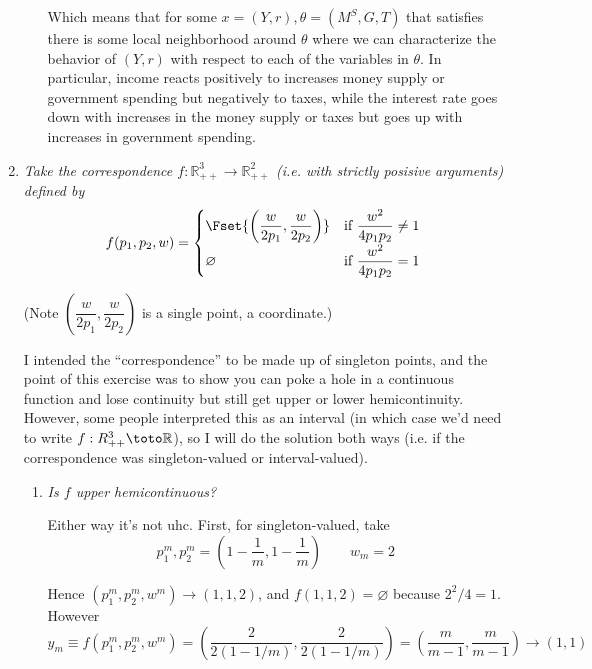\documentclass{article}
\begin{document}
\begin{enumerate}[1.]
\begin{enumerate}[a)]
      Which means that for some $x = (Y, r), \theta = (M^S, G, T)$ that satisfies  there is some local neighborhood around $\theta$ where we can characterize the behavior of $(Y, r)$ with respect to each of the variables in $\theta$. In particular, income reacts positively to increases money supply or government spending but negatively to taxes, while the interest rate goes down with increases in the money supply or taxes but goes up with increases in government spending.
    \end{enumerate}

  \item {\itshape
    Take the correspondence $f: \mathbb{R}^3_{++} \to \mathbb{R}^2_{++}$ (i.e. with strictly posisive arguments) defined by
    \[
      f(p_1, p_2, w)
      =
      \begin{cases}
        \Fset{
          \left(\dfrac{w}{2p_1}, \dfrac{w}{2 p_2}\right)
        }
          & \text{if } \dfrac{w^2}{4 p_1 p_2} \ne 1 \\[6pt]
        \varnothing
          & \text{if } \dfrac{w^2}{4 p_1 p_2} = 1
      \end{cases}
    \]

    (Note $\left(\dfrac{w}{2p_1}, \dfrac{w}{2 p_2}\right)$ is a single point, a coordinate.)}

    \solution I intended the ``correspondence'' to be made up of singleton points, and the point of this exercise was to show you can poke a hole in a continuous function and lose continuity but still get upper or lower hemicontinuity. However, some people interpreted this as an interval (in which case we'd need to write $f: R^{3}_{++} \toto \mathbb{R}$), so I will do the solution both ways (i.e. if the correspondence was singleton-valued or interval-valued).

    \begin{enumerate}
      \item \textit{Is $f$ upper hemicontinuous?}

        \solution Either way it's not uhc. First, for singleton-valued, take
        \[
          p^m_1, p^m_2
          =
          \left(
            1 - \dfrac{1}{m},
            1 - \dfrac{1}{m}
          \right)
          \quad\quad
          w_m = 2
        \]

        Hence $(p^m_1, p^m_2, w^m) \to (1, 1, 2)$, and $f(1, 1, 2) = \varnothing$ because $2^2 / 4 = 1$. However
        \[
          y_m
          \equiv
          f(p^m_1, p^m_2, w^m)
          =
          \left(\dfrac{2}{2 (1 - 1 / m)}, \dfrac{2}{2 (1 - 1 / m)}\right)
          =
          \left(\dfrac{m}{m - 1}, \dfrac{m}{m - 1}\right)
          \to
          (1, 1)
        \]


\end{enumerate}
\end{enumerate}
\end{document}
